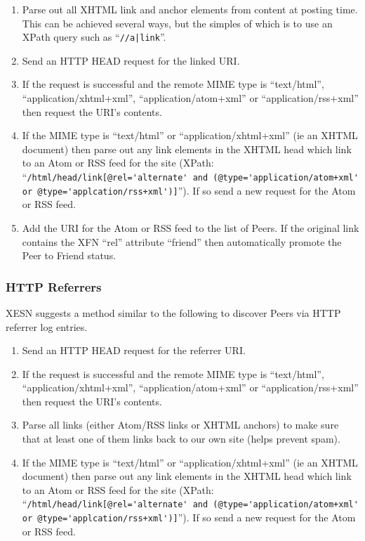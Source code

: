 \documentclass[titlepage,english,a4paper,twoside,dvips]{article}
\begin{document}
\begin{enumerate}

\item Parse out all XHTML link and anchor elements from content at posting time.  This can be achieved several ways, but the simples of which is to use an XPath query such as ``\verb+//a|link+''.

\item Send an HTTP HEAD request for the linked URI.

\item If the request is successful and the remote MIME type is ``text/html'', ``application/xhtml+xml'', ``application/atom+xml'' or ``application/rss+xml'' then request the URI's contents.

\item If the MIME type is ``text/html'' or ``application/xhtml+xml'' (ie an XHTML document) then parse out any link elements in the XHTML head which link to an Atom or RSS feed for the site (XPath: ``\verb|/html/head/link[@rel='alternate' and (@type='application/atom+xml' or @type='applcation/rss+xml')]|'').  If so send a new request for the Atom or RSS feed.

\item Add the URI for the Atom or RSS feed to the list of Peers.  If the original link contains the XFN ``rel'' attribute ``friend'' then automatically promote the Peer to Friend status.

\end{enumerate}

\subsubsection{HTTP Referrers}

XESN suggests a method similar to the following to discover Peers via HTTP referrer log entries.

\begin{enumerate}

\item Send an HTTP HEAD request for the referrer URI.

\item If the request is successful and the remote MIME type is ``text/html'', ``application/xhtml+xml'', ``application/atom+xml'' or ``application/rss+xml'' then request the URI's contents.

\item Parse all links (either Atom/RSS links or XHTML anchors) to make sure that at least one of them links back to our own site (helps prevent spam).

\item If the MIME type is ``text/html'' or ``application/xhtml+xml'' (ie an XHTML document) then parse out any link elements in the XHTML head which link to an Atom or RSS feed for the site (XPath: ``\verb|/html/head/link[@rel='alternate' and (@type='application/atom+xml' or @type='applcation/rss+xml')]|'').  If so send a new request for the Atom or RSS feed.

\end{enumerate}
\end{document}

